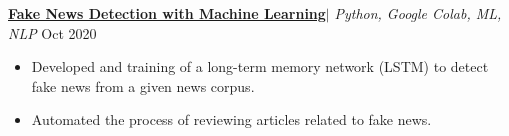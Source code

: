 {\textbf{\href{https://github.com/migrmez/FakeNewsDetectionML}{Fake News Detection with Machine Learning}}$|$ \emph{Python, Google Colab, ML, NLP}} \hfill Oct 2020\par
\begin{itemize}
	\item Developed and training of a long-term memory network (LSTM) to detect fake news from a given news corpus.
	\item Automated the process of reviewing articles related to fake news.
\end{itemize}\vspace{0.1cm}\par